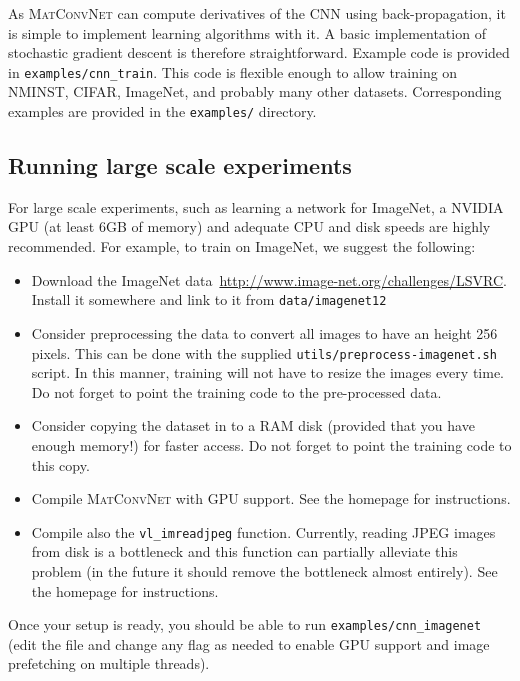 \documentclass[12pt]{article}
\newcommand{\vlnn}{\textsc{MatConvNet}\xspace}
\begin{document}
As \vlnn can compute derivatives of the CNN using back-propagation, it is simple to implement learning algorithms with it. A basic implementation of stochastic gradient descent is therefore straightforward. Example code is provided in \verb!examples/cnn_train!. This code is flexible enough to allow training on NMINST, CIFAR, ImageNet, and probably many other datasets. Corresponding examples are provided in the \verb!examples/! directory.

\subsection{Running large scale experiments}

For large scale experiments, such as learning a network for ImageNet, a NVIDIA GPU (at least 6GB of memory) and adequate CPU and disk speeds are highly recommended. For example, to train on ImageNet, we suggest the following:
\begin{itemize}
\item Download the ImageNet data~\url{http://www.image-net.org/challenges/LSVRC}. Install it somewhere and link to it from \verb!data/imagenet12!
\item Consider preprocessing the data to convert all images to have an height 256 pixels. This can be done with the supplied \verb!utils/preprocess-imagenet.sh! script. In this manner, training will not have to resize the images every time. Do not forget to point the training code to the pre-processed data.
\item Consider copying the dataset in to a RAM disk (provided that you have enough memory!) for faster access. Do not forget to point the training code to this copy.
\item Compile \vlnn with GPU support. See the homepage for instructions.
\item Compile also the \verb!vl_imreadjpeg! function. Currently, reading JPEG images from disk is a bottleneck and this function can partially alleviate this problem (in the future it should remove the bottleneck almost entirely). See the homepage for instructions.
\end{itemize}

Once your setup is ready, you should be able to run \verb!examples/cnn_imagenet! (edit the file and change any flag as needed to enable GPU support and image prefetching on multiple threads).
\end{document}
